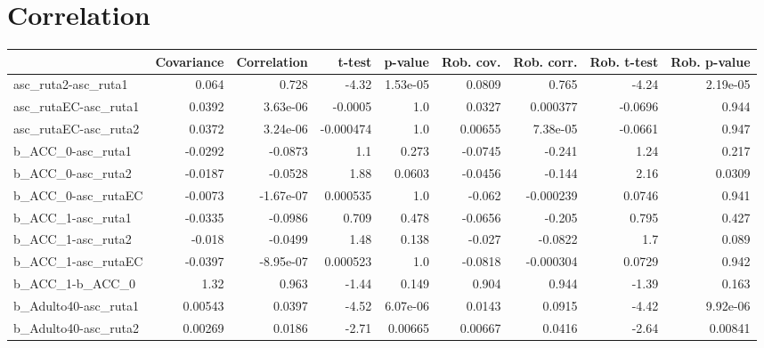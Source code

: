 \section{Correlation}
\begin{tabular}{lrrrrrrrr}
\toprule
{} &  Covariance &  Correlation &    t-test &  p-value &  Rob. cov. &  Rob. corr. &  Rob. t-test &  Rob. p-value \\
\midrule
asc\_ruta2-asc\_ruta1        &       0.064 &        0.728 &     -4.32 & 1.53e-05 &     0.0809 &       0.765 &        -4.24 &      2.19e-05 \\
asc\_rutaEC-asc\_ruta1       &      0.0392 &     3.63e-06 &   -0.0005 &      1.0 &     0.0327 &    0.000377 &      -0.0696 &         0.944 \\
asc\_rutaEC-asc\_ruta2       &      0.0372 &     3.24e-06 & -0.000474 &      1.0 &    0.00655 &    7.38e-05 &      -0.0661 &         0.947 \\
b\_ACC\_0-asc\_ruta1          &     -0.0292 &      -0.0873 &       1.1 &    0.273 &    -0.0745 &      -0.241 &         1.24 &         0.217 \\
b\_ACC\_0-asc\_ruta2          &     -0.0187 &      -0.0528 &      1.88 &   0.0603 &    -0.0456 &      -0.144 &         2.16 &        0.0309 \\
b\_ACC\_0-asc\_rutaEC         &     -0.0073 &    -1.67e-07 &  0.000535 &      1.0 &     -0.062 &   -0.000239 &       0.0746 &         0.941 \\
b\_ACC\_1-asc\_ruta1          &     -0.0335 &      -0.0986 &     0.709 &    0.478 &    -0.0656 &      -0.205 &        0.795 &         0.427 \\
b\_ACC\_1-asc\_ruta2          &      -0.018 &      -0.0499 &      1.48 &    0.138 &     -0.027 &     -0.0822 &          1.7 &         0.089 \\
b\_ACC\_1-asc\_rutaEC         &     -0.0397 &    -8.95e-07 &  0.000523 &      1.0 &    -0.0818 &   -0.000304 &       0.0729 &         0.942 \\
b\_ACC\_1-b\_ACC\_0            &        1.32 &        0.963 &     -1.44 &    0.149 &      0.904 &       0.944 &        -1.39 &         0.163 \\
b\_Adulto40-asc\_ruta1       &     0.00543 &       0.0397 &     -4.52 & 6.07e-06 &     0.0143 &      0.0915 &        -4.42 &      9.92e-06 \\
b\_Adulto40-asc\_ruta2       &     0.00269 &       0.0186 &     -2.71 &  0.00665 &    0.00667 &      0.0416 &        -2.64 &       0.00841 \\

\end{tabular}
